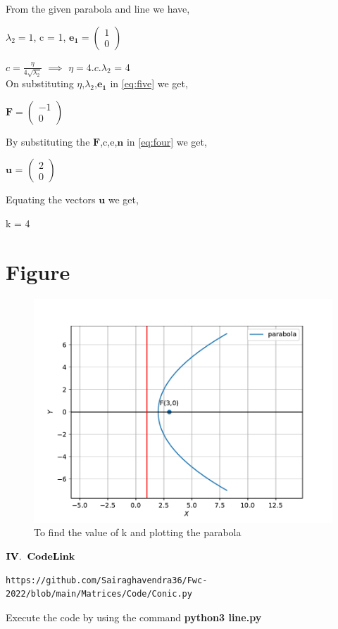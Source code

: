 \documentclass[journal,12pt,twocolumn]{IEEEtran}
\newcommand{\myvec}[1]{\ensuremath{\begin{pmatrix}#1\end{pmatrix}}}
\let\vec\mathbf
\begin{document}
From the given parabola and line we have,
\begin{center}
$\lambda_2 =1$, c = 1, $\vec{e_1} = \myvec{1 \\ 0}$
\end{center}


$c = \frac{\eta}{4\sqrt{\lambda_2}}$ $\implies$ $\eta = 4.c.\lambda_2$ = 4\\

On substituting $\eta$,$\lambda_2$,$\vec{e_1}$ in \eqref{eq:five} we get,

\begin{center}
$\vec{F} = \myvec{-1 \\ 0}$
\end{center}

By substituting the $\vec{F}$,c,e,$\vec{n}$ in \eqref{eq:four} we get,
\begin{center}
$\vec{u}$ = $\myvec{2 \\ 0}$
\end{center} 

Equating the vectors $\vec{u}$ we get,

\begin{center}
k = 4
\end{center}


\section{Figure}
\begin{figure}[h]
\includegraphics[width=\columnwidth]{fig.pdf}
\caption{To find the value of k and plotting the parabola}
    \label{fig:my_label}
\end{figure}


\begin{center}
$\vec{IV.\hspace{.2cm} Code Link}$
\end{center}
\begin{lstlisting}
https://github.com/Sairaghavendra36/Fwc-2022/blob/main/Matrices/Code/Conic.py
\end{lstlisting}
Execute the code by using the command
\textbf{python3 line.py}
\end{document}

